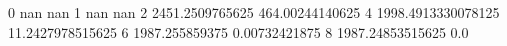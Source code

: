 0 nan nan
1 nan nan
2 2451.2509765625 464.00244140625
4 1998.4913330078125 11.2427978515625
6 1987.255859375 0.00732421875
8 1987.24853515625 0.0
